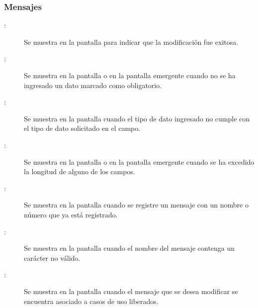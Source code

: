 \subsubsection{Mensajes}

	
\begin{description}
	\item[:] Se muestra en la pantalla  para indicar que la modificación fue exitosa.
	\item[:] Se muestra en la pantalla  o en la pantalla emergente  cuando no se ha ingresado un dato marcado como obligatorio.
	\item[:] Se muestra en la pantalla  cuando el tipo de dato ingresado no cumple con el tipo de dato solicitado en el campo.
	\item[:] Se muestra en la pantalla  o en la pantalla emergente  cuando se ha excedido la longitud de alguno de los campos.
	\item[:] Se muestra en la pantalla  cuando se registre un mensaje con un nombre o número que ya está registrado.
	\item[:] Se muestra en la pantalla  cuando el nombre del mensaje contenga un carácter no válido.
	\item[:] Se muestra en la pantalla  cuando el mensaje que se desea modificar se encuentra asociado a casos de uso liberados.
\end{description}
